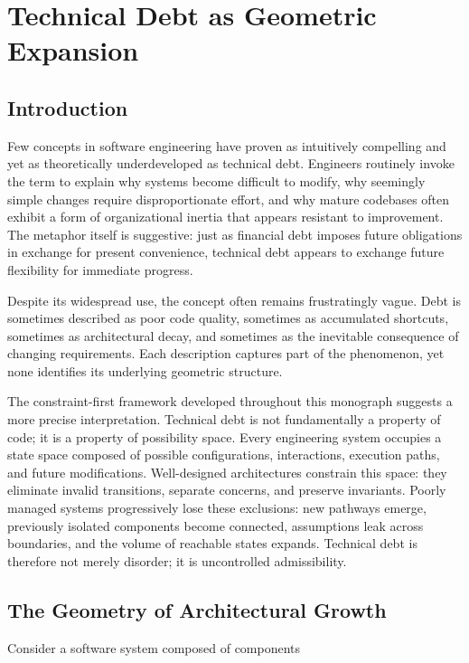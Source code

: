 \documentclass[11pt,oneside]{book}
\theoremstyle{plain}
\theoremstyle{definition}
\theoremstyle{remark}
\begin{document}
\chapter{Technical Debt as Geometric Expansion}

\section{Introduction}

Few concepts in software engineering have proven as intuitively compelling and yet as theoretically underdeveloped as technical debt. Engineers routinely invoke the term to explain why systems become difficult to modify, why seemingly simple changes require disproportionate effort, and why mature codebases often exhibit a form of organizational inertia that appears resistant to improvement. The metaphor itself is suggestive: just as financial debt imposes future obligations in exchange for present convenience, technical debt appears to exchange future flexibility for immediate progress.

Despite its widespread use, the concept often remains frustratingly vague. Debt is sometimes described as poor code quality, sometimes as accumulated shortcuts, sometimes as architectural decay, and sometimes as the inevitable consequence of changing requirements. Each description captures part of the phenomenon, yet none identifies its underlying geometric structure.

The constraint-first framework developed throughout this monograph suggests a more precise interpretation. Technical debt is not fundamentally a property of code; it is a property of possibility space. Every engineering system occupies a state space composed of possible configurations, interactions, execution paths, and future modifications. Well-designed architectures constrain this space: they eliminate invalid transitions, separate concerns, and preserve invariants. Poorly managed systems progressively lose these exclusions: new pathways emerge, previously isolated components become connected, assumptions leak across boundaries, and the volume of reachable states expands. Technical debt is therefore not merely disorder; it is uncontrolled admissibility.

\section{The Geometry of Architectural Growth}

Consider a software system composed of components
\end{document}
